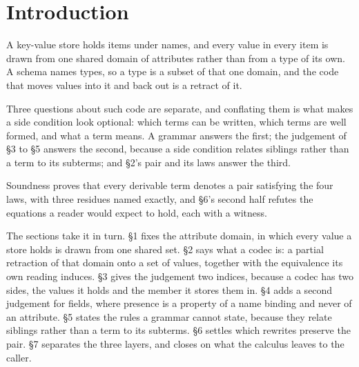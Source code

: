 \section*{Introduction}

A key-value store holds items under names, and every value in every item is drawn from one shared
domain of attributes rather than from a type of its own. A schema names types, so a type is a
subset of that one domain, and the code that moves values into it and back out is a retract of it.

Three questions about such code are separate, and conflating them is what makes a side condition
look optional: which terms can be written, which terms are well formed, and what a term means. A
grammar answers the first; the judgement of §3 to §5 answers the second, because a side condition
relates siblings rather than a term to its subterms; and §2's pair and its laws answer the third.

Soundness proves that every derivable term denotes a pair satisfying the four laws, with three
residues named exactly, and §6's second half refutes the equations a reader would expect to hold,
each with a witness.

The sections take it in turn. §1 fixes the attribute domain, in which every value a store holds is
drawn from one shared set. §2 says what a codec is: a partial retraction of that domain onto a set
of values, together with the equivalence its own reading induces. §3 gives the judgement two
indices, because a codec has two sides, the values it holds and the member it stores them in. §4
adds a second judgement for fields, where presence is a property of a name binding and never of an
attribute. §5 states the rules a grammar cannot state, because they relate siblings rather than a
term to its subterms. §6 settles which rewrites preserve the pair. §7 separates the three layers,
and closes on what the calculus leaves to the caller.
